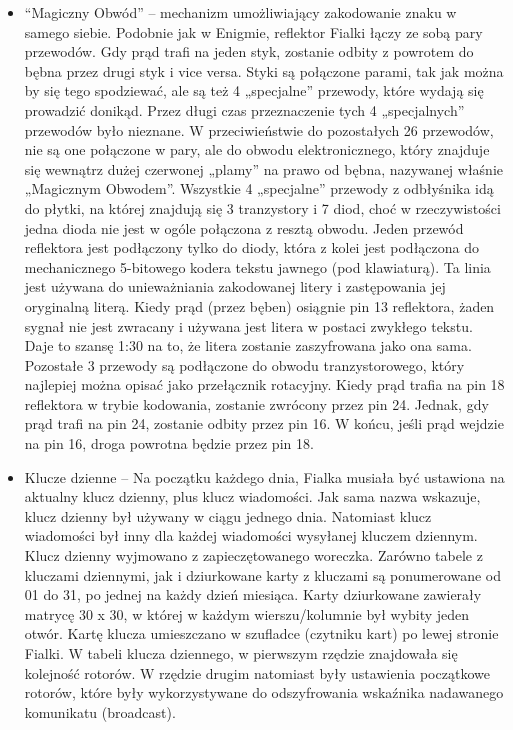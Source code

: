 \documentclass{article}
\begin{document}
\begin{itemize}
\item “Magiczny Obwód” – mechanizm umożliwiający zakodowanie znaku w samego siebie. Podobnie jak w Enigmie, reflektor Fialki łączy ze sobą pary przewodów. Gdy prąd trafi na jeden styk, zostanie odbity z powrotem do bębna przez drugi styk i vice versa. Styki są połączone parami, tak jak można by się tego spodziewać, ale są też 4 „specjalne” przewody, które wydają się prowadzić donikąd. Przez długi czas przeznaczenie tych 4 „specjalnych” przewodów było nieznane. W przeciwieństwie do pozostałych 26 przewodów, nie są one połączone w pary, ale do obwodu elektronicznego, który znajduje się wewnątrz dużej czerwonej „plamy” na prawo od bębna, nazywanej właśnie „Magicznym Obwodem”. Wszystkie 4 „specjalne” przewody z odbłyśnika idą do płytki, na której znajdują się 3 tranzystory i 7 diod, choć w rzeczywistości jedna dioda nie jest w ogóle połączona z resztą obwodu. Jeden przewód reflektora jest podłączony tylko do diody, która z kolei jest podłączona do mechanicznego 5-bitowego kodera tekstu jawnego (pod klawiaturą). Ta linia jest używana do unieważniania zakodowanej litery i zastępowania jej oryginalną literą. Kiedy prąd (przez bęben) osiągnie pin 13 reflektora, żaden sygnał nie jest zwracany i używana jest litera w postaci zwykłego tekstu. Daje to szansę 1:30 na to, że litera zostanie zaszyfrowana jako ona sama. Pozostałe 3 przewody są podłączone do obwodu tranzystorowego, który najlepiej można opisać jako przełącznik rotacyjny. Kiedy prąd trafia na pin 18 reflektora w trybie kodowania, zostanie zwrócony przez pin 24. Jednak, gdy prąd trafi na pin 24, zostanie odbity przez pin 16. W końcu, jeśli prąd wejdzie na pin 16, droga powrotna będzie przez pin 18.
\item Klucze dzienne – Na początku każdego dnia, Fialka musiała być ustawiona na aktualny klucz dzienny, plus klucz wiadomości. Jak sama nazwa wskazuje, klucz dzienny był używany w ciągu jednego dnia. Natomiast klucz wiadomości był inny dla każdej wiadomości wysyłanej kluczem dziennym. Klucz dzienny wyjmowano z zapieczętowanego woreczka. Zarówno tabele z kluczami dziennymi, jak i dziurkowane karty z kluczami są ponumerowane od 01 do 31, po jednej na każdy dzień miesiąca. Karty dziurkowane zawierały matrycę 30 x 30, w której w każdym wierszu/kolumnie był wybity jeden otwór. Kartę klucza umieszczano w szufladce (czytniku kart) po lewej stronie Fialki. 
W tabeli klucza dziennego, w pierwszym rzędzie znajdowała się kolejność rotorów. W rzędzie drugim natomiast były ustawienia początkowe rotorów, które były wykorzystywane do odszyfrowania wskaźnika nadawanego komunikatu (broadcast).

\end{itemize}
\end{document}
